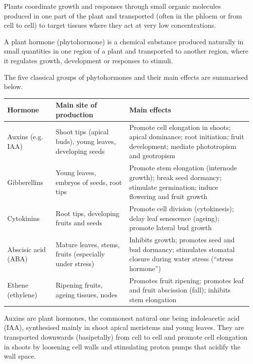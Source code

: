 \documentclass[11pt]{article}
\newcommand{\cle}[1]{{\popxbold\color{popdark}#1}}
\newcounter{popsec}
\newcounter{popsub}
\newcommand{\courssub}[1]{%
  \stepcounter{popsub}%
  \par\vspace{9pt}\noindent{\popxbold\fontsize{11.5}{13}\selectfont\color{popink}{\color{poporange}\thepopsec.\thepopsub}\hspace{6pt}#1}\par\nopagebreak\vspace{4pt}
}
\begin{document}
\courssub{Plant Hormones (Phytohormones)}

Plants coordinate growth and responses through small organic molecules produced in one part of the plant and transported (often in the phloem or from cell to cell) to target tissues where they act at very low concentrations.

\begin{definition}
A \cle{plant hormone} (phytohormone) is a chemical substance produced naturally in small quantities in one region of a plant and transported to another region, where it regulates growth, development or responses to stimuli.
\end{definition}

The five classical groups of phytohormones and their main effects are summarised below.

\begin{center}
\begin{tabularx}{\linewidth}{|l|X|X|}
\hline
\rowcolor{popblueL} \textbf{Hormone} & \textbf{Main site of production} & \textbf{Main effects} \\
\hline
Auxins (e.g. IAA) & Shoot tips (apical buds), young leaves, developing seeds & Promote cell elongation in shoots; apical dominance; root initiation; fruit development; mediate phototropism and geotropism \\
\hline
Gibberellins & Young leaves, embryos of seeds, root tips & Promote stem elongation (internode growth); break seed dormancy; stimulate germination; induce flowering and fruit growth \\
\hline
Cytokinins & Root tips, developing fruits and seeds & Promote cell division (cytokinesis); delay leaf senescence (ageing); promote lateral bud growth \\
\hline
Abscisic acid (ABA) & Mature leaves, stems, fruits (especially under stress) & Inhibits growth; promotes seed and bud dormancy; stimulates stomatal closure during water stress (``stress hormone'') \\
\hline
Ethene (ethylene) & Ripening fruits, ageing tissues, nodes & Promotes fruit ripening; promotes leaf and fruit abscission (fall); inhibits stem elongation \\
\hline
\end{tabularx}
\end{center}

\begin{definition}[Auxin]
\cle{Auxins} are plant hormones, the commonest natural one being \cle{indoleacetic acid (IAA)}, synthesised mainly in shoot apical meristems and young leaves. They are transported downwards (basipetally) from cell to cell and promote cell elongation in shoots by loosening cell walls and stimulating proton pumps that acidify the wall space.
\end{definition}
\end{document}

